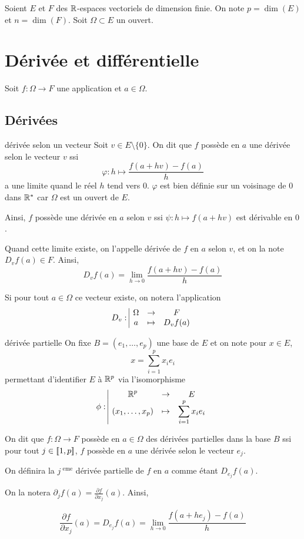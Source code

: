 Soient $E$ et $F$ des $\mathbb{R}$-espaces vectoriels de dimension finie. 
On note $p = \dim(E)$ et $n = \dim(F)$.
Soit $\Omega \subset E$ un ouvert. 

\section{Dérivée et différentielle}

Soit $f : \Omega \to F$ une application et $a \in \Omega$.

\subsection{Dérivées}

\begin{definition}{dérivée selon un vecteur}{}
    Soit $v \in E \setminus \{0\}$. On dit que $f$ possède en $a$ une dérivée selon le vecteur $v$ ssi 
    \[
        \varphi : h \mapsto \frac {f(a + hv) - f(a)} h 
    \]
    a une limite quand le réel $h$ tend vers $0$. $\varphi$ est bien définie sur un voisinage de $0$
    dans $\mathbb{R}^*$ car $\Omega$ est un ouvert de $E$.

    Ainsi, $f$ possède une dérivée en $a$ selon $v$ ssi $\psi : h \mapsto f(a + hv)$ 
    est dérivable en $0$. 

    Quand cette limite existe, on l'appelle dérivée de $f$ en $a$ selon $v$, 
    et on la note $D_v f(a) \in F$. Ainsi, 
    \[
        D_v f(a) = \lim_{h \to 0} \frac{f(a + hv) - f(a)}{h}
    \]

    Si pour tout $a \in \Omega$ ce vecteur existe, on notera l'application
    \[ D_v: \space \begin{array}{|ccc} \displaystyle \Omega & \to & \displaystyle F \\ \displaystyle a & \mapsto & \displaystyle D_v f(a) \end{array} \]
\end{definition}


\begin{definition}{dérivée partielle}{}
    On fixe $B = (e_1, \ldots, e_p)$ une base de $E$ et on note pour $x \in E$, 
    $$x = \sum_{i=1}^p x_i e_i$$
    permettant d'identifier $E$ à $\mathbb{R}^p$ via l'isomorphisme 
    \[ \phi: \space \begin{array}{|ccc} \displaystyle \mathbb{R}^p & \to & \displaystyle E \\ \displaystyle (x_1, \ldots, x_p) & \mapsto & \displaystyle \sum_{i=1}^p x_i e_i \end{array} \]

    On dit que $f : \Omega \to F$ possède en $a \in \Omega$ des dérivées partielles dans la base
    $B$ ssi pour tout $j \in [\![1, p]\!]$, $f$ possède en $a$ une dérivée selon le vecteur 
    $e_j$. 

    On définira la $j^{\text{ eme}}$ dérivée partielle de $f$ en $a$ comme étant $D_{e_j} f (a)$. 

    On la notera $\partial_j f(a) = \frac{\partial f}{\partial x_j} (a)$. Ainsi, 

    $$\frac{\partial f}{\partial x_j}(a) = D_{e_j} f(a) = \lim_{h \to 0} \frac{f(a + h e_j) - f(a)}{h}$$
\end{definition}


